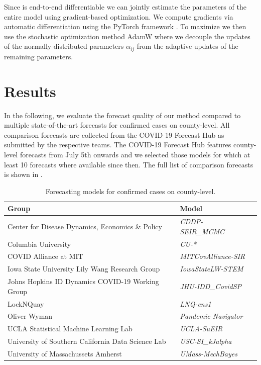 \documentclass[nobib]{tufte-handout}
\begin{document}
Since  is end-to-end differentiable we can jointly estimate the
parameters of the entire model using gradient-based optimization. We compute
gradients via automatic differentiation using the PyTorch framework
\citep{paszke2019pytorch}. To maximize  we then use the stochastic
optimization method AdamW \citep{loshchilov2018decoupled} where we decouple the
updates of the normally distributed parameters \(\alpha_{ij}\) from the adaptive
updates of the remaining parameters.

\section{Results}
\label{sec:org7d76cd4}
In the following, we evaluate the forecast quality of our method compared to
multiple state-of-the-art forecasts for confirmed cases on
county-level. All comparison forecasts are collected from the COVID-19 Forecast
Hub as submitted by
the respective teams. The COVID-19 Forecast Hub features county-level forecasts
from July 5th onwards and we selected those models for which at least 10 forecasts
where available since then. The full list of comparison forecasts is shown in
.

\begin{table}[t]
\small
\centering
\begin{tabular}{lll}
\toprule
\bf Group & \bf Model \\
\midrule
Center for Disease Dynamics, Economics \& Policy & \it CDDP-SEIR\_MCMC & \citep{cddep_seir_mcmc} \\
Columbia University & \it CU-* & \citep{forecasts/columbia} \\
COVID Alliance at MIT & \it MITCovAlliance-SIR & \citep{baek2020limits} \\
Iowa State University Lily Wang Research Group & \it IowaStateLW-STEM & \citep{wang2020spatiotemporal} \\
Johns Hopkins ID Dynamics COVID-19 Working Group & \it JHU-IDD\_CovidSP & \citep{forecasts/jhu_idd_covidsp} \\
LockNQuay & \it LNQ-ens1 & \citep{forecasts/lnq_ens1} \\
Oliver Wyman & \it Pandemic Navigator & \citep{forecasts/oliver_wyman} \\
UCLA Statistical Machine Learning Lab & \it UCLA-SuEIR & \citep{forecasts/Zou2020.05.24.20111989} \\
University of Southern California Data Science Lab & \it USC-SI\_kJalpha & \citep{srivastava2020fast} \\
University of Massachussets Amherst & \it UMass-MechBayes & \citep{forecasts/umass_mechbayes} \\
\bottomrule
\end{tabular}
\vspace*{2em}
\caption{Forecasting models for confirmed cases on county-level.\label{tab:forecasts}}
\end{table}
\end{document}
